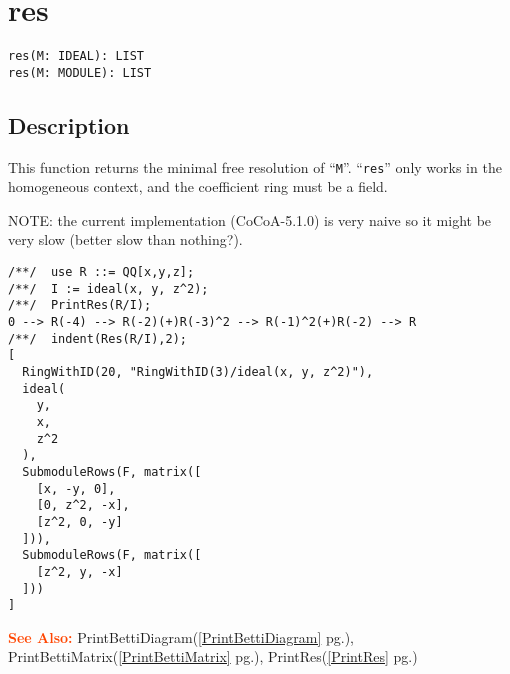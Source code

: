 \documentclass[a4paper]{mybook}
\newenvironment{command}{}{} %
\newcommand\SeeAlso{\par\textcolor{OrangeRed}{\textbf{\large See Also: }}}
\begin{document}
\section{res}
\label{res}
\begin{command} %


\begin{Verbatim}[label=syntax, rulecolor=\color{MidnightBlue},
frame=single]
res(M: IDEAL): LIST
res(M: MODULE): LIST
\end{Verbatim}


\subsection*{Description}

This function returns the minimal free resolution of ``\verb&M&''.
``\verb&res&'' only works in the homogeneous context, and the coefficient ring
must be a field.
\par 
NOTE: the current implementation (CoCoA-5.1.0) is very naive so it
might be very slow (better slow than nothing?).
\begin{Verbatim}[label=example, rulecolor=\color{PineGreen}, frame=single]
/**/  use R ::= QQ[x,y,z];
/**/  I := ideal(x, y, z^2);
/**/  PrintRes(R/I);
0 --> R(-4) --> R(-2)(+)R(-3)^2 --> R(-1)^2(+)R(-2) --> R
/**/  indent(Res(R/I),2);
[
  RingWithID(20, "RingWithID(3)/ideal(x, y, z^2)"),
  ideal(
    y,
    x,
    z^2
  ),
  SubmoduleRows(F, matrix([
    [x, -y, 0],
    [0, z^2, -x],
    [z^2, 0, -y]
  ])),
  SubmoduleRows(F, matrix([
    [z^2, y, -x]
  ]))
]
\end{Verbatim}


\SeeAlso %
  PrintBettiDiagram(\ref{PrintBettiDiagram} pg.\pageref{PrintBettiDiagram}), 
    PrintBettiMatrix(\ref{PrintBettiMatrix} pg.\pageref{PrintBettiMatrix}), 
    PrintRes(\ref{PrintRes} pg.\pageref{PrintRes})
\end{command} %
\end{document}
